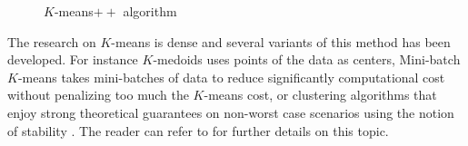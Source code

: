\begin{figure}[h]
\begin{center}
   \caption{$K$-means$++$ algorithm}
   \label{algo:kmeans++_algo}
\end{center}
\vspace{-15pt}
\end{figure}
The research on $K$-means is dense and several variants of this method has been developed. For instance $K$-medoids \citep{KaufmanR90} uses points of the data as centers, Mini-batch $K$-means \citep{Sculley:2010:WKC:1772690.1772862} takes mini-batches of data to reduce significantly computational cost without penalizing too much the $K$-means cost, or clustering algorithms that enjoy strong theoretical guarantees on non-worst case scenarios using the notion of stability \citep{Ostrovsky2006}. The reader can refer to \citep{hennig2015handbook} for further details on this topic.

